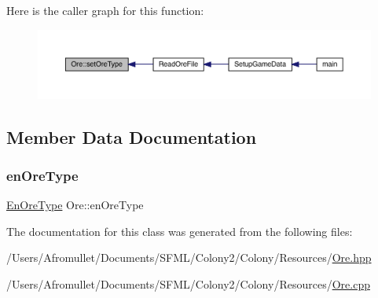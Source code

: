 Here is the caller graph for this function\+:
\nopagebreak
\begin{figure}[H]
\begin{center}
\leavevmode
\includegraphics[width=350pt]{d7/d51/class_ore_a7d463e3c3da27da5a4e645c8ea062251_icgraph}
\end{center}
\end{figure}


\subsection{Member Data Documentation}
\mbox{\label{class_ore_a834b6f726ecb7ce8e0904fd58f551a16}} 
\subsubsection{\texorpdfstring{en\+Ore\+Type}{enOreType}}
{\footnotesize\ttfamily \mbox{\hyperlink{_ore_8hpp_a4dd6f8b19eecee73049dd69be5803f14}{En\+Ore\+Type}} Ore\+::en\+Ore\+Type\hspace{0.3cm}{\ttfamily [private]}}



The documentation for this class was generated from the following files\+:\begin{DoxyCompactItemize}
\item 
/\+Users/\+Afromullet/\+Documents/\+S\+F\+M\+L/\+Colony2/\+Colony/\+Resources/\mbox{\hyperlink{_ore_8hpp}{Ore.\+hpp}}\item 
/\+Users/\+Afromullet/\+Documents/\+S\+F\+M\+L/\+Colony2/\+Colony/\+Resources/\mbox{\hyperlink{_ore_8cpp}{Ore.\+cpp}}\end{DoxyCompactItemize}
